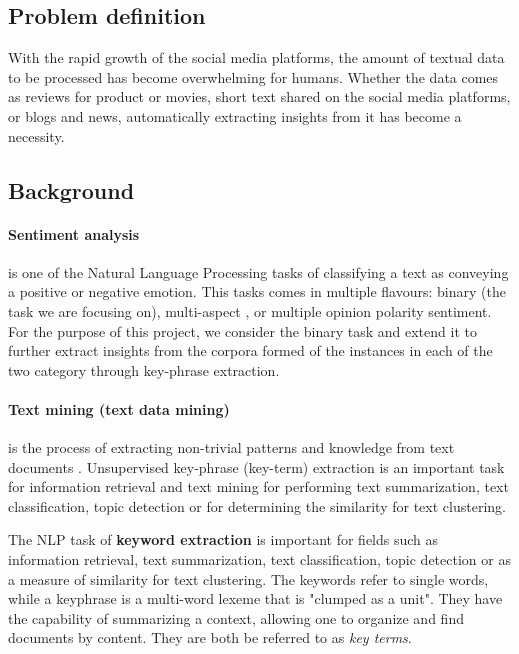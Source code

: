 \subsection{Problem definition}
With the rapid growth of the social media platforms, the amount of textual data to be processed has become overwhelming for humans. Whether the data comes as reviews for product or movies, short text shared on the social media platforms, or blogs and news, automatically extracting insights from it has become a necessity.


\subsection{Background}

\paragraph{Sentiment analysis} is one of the Natural Language Processing tasks of classifying a text as conveying a positive or negative emotion. This tasks comes in multiple flavours: binary (the task we are focusing on), multi-aspect \cite{multiaspect}, or multiple opinion polarity sentiment. For the purpose of this project, we consider the binary task and extend it to further extract insights from the corpora formed of the instances in each of the two category through key-phrase extraction.


\paragraph{Text mining (text data mining)} is the process of extracting non-trivial patterns and knowledge from text documents \cite{stateofartchallenge}.
Unsupervised key-phrase (key-term) extraction is an important task for information retrieval and text mining for performing text summarization, text classification, topic detection or for determining the similarity for text clustering. 

The NLP task of \textbf{keyword extraction} is important for fields such as information retrieval, text summarization, text classification, topic detection or as a measure of similarity for text clustering. 
The keywords refer to single words, while a keyphrase is a multi-word lexeme that is "clumped as a unit"\cite{manningshutze}. They have the capability of summarizing a context, allowing one to organize and find documents by content. They are both be referred to as \textit{key terms}.

